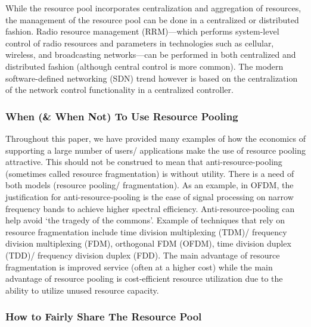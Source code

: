\documentclass{sigcomm-alternate}
\begin{document}
While the resource pool incorporates centralization and aggregation of resources, the management of the resource pool can be done in a centralized or distributed fashion. Radio resource management (RRM)---which performs system-level control of radio resources and parameters in technologies such as cellular, wireless, and broadcasting networks---can be performed in both centralized and distributed fashion (although central control is more common). The modern software-defined networking (SDN) trend however is based on the centralization of the network control functionality in a centralized controller. 
 




\vspace{1mm}
\subsubsection{When (\& When Not) To Use Resource Pooling}
 
Throughout this paper, we have provided many examples of how the economics of supporting a large number of users/ applications make the use of resource pooling attractive. This should not be construed to mean that anti-resource-pooling (sometimes called resource fragmentation) is without utility.  There is a need of both models (resource pooling/ fragmentation). As an example, in OFDM, the justification for anti-resource-pooling is the ease of signal processing on narrow frequency bands to achieve higher spectral efficiency. Anti-resource-pooling can help avoid `the tragedy of the commons'. Example of techniques that rely on resource fragmentation include time division multiplexing (TDM)/ frequency division multiplexing (FDM), orthogonal FDM (OFDM), time division duplex (TDD)/ frequency division duplex (FDD). The main advantage of resource fragmentation is improved service (often at a higher cost) while the main advantage of resource pooling is cost-efficient resource utilization due to the ability to utilize unused resource capacity.

\vspace{1mm}
\subsubsection{How to Fairly Share The Resource Pool}
\end{document}
